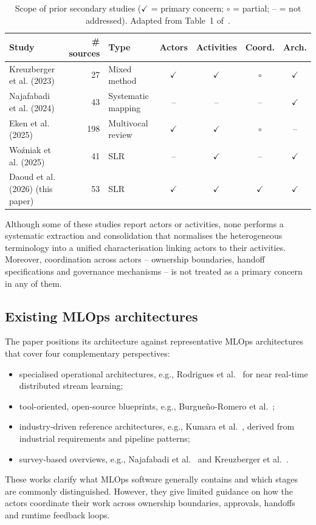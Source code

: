\documentclass[11pt,a4paper]{article}
\begin{document}
\begin{table}[h]
\centering
\caption{Scope of prior secondary studies ($\checkmark$ = primary concern; $\circ$ = partial; -- = not addressed). Adapted from Table~1 of~\cite{daoud2026}.}\label{tab:secondary}
\small
\begin{tabular}{@{}lrlcccc@{}}
\toprule
Study & \# sources & Type & Actors & Activities & Coord. & Arch. \\
\midrule
Kreuzberger et al. (2023)~\cite{kreuzberger2023} & 27 & Mixed method & $\checkmark$ & $\checkmark$ & $\circ$ & $\checkmark$ \\
Najafabadi et al. (2024)~\cite{najafabadi2024} & 43 & Systematic mapping & -- & -- & -- & $\checkmark$ \\
Eken et al. (2025)~\cite{eken2025} & 198 & Multivocal review & $\checkmark$ & $\checkmark$ & $\circ$ & -- \\
Wo\'zniak et al. (2025)~\cite{wozniak2025} & 41 & SLR & -- & $\checkmark$ & -- & $\checkmark$ \\
Daoud et al. (2026) (this paper) & 53 & SLR & $\checkmark$ & $\checkmark$ & $\checkmark$ & $\checkmark$ \\
\bottomrule
\end{tabular}
\end{table}

Although some of these studies report actors or activities, none performs a systematic extraction and consolidation that normalises the heterogeneous terminology into a unified characterisation linking actors to their activities. Moreover, coordination across actors -- ownership boundaries, handoff specifications and governance mechanisms -- is not treated as a primary concern in any of them.

\subsection{Existing MLOps architectures}

The paper positions its architecture against representative MLOps architectures that cover four complementary perspectives:
\begin{itemize}
  \item specialised operational architectures, e.g., Rodrigues et al.~\cite{rodrigues2025} for near real-time distributed stream learning;
  \item tool-oriented, open-source blueprints, e.g., Burgue\~no-Romero et al.~\cite{burgueno2025};
  \item industry-driven reference architectures, e.g., Kumara et al.~\cite{kumara2025}, derived from industrial requirements and pipeline patterns;
  \item survey-based overviews, e.g., Najafabadi et al.~\cite{najafabadi2024} and Kreuzberger et al.~\cite{kreuzberger2023}.
\end{itemize}
These works clarify what MLOps software generally contains and which stages are commonly distinguished. However, they give limited guidance on how the actors coordinate their work across ownership boundaries, approvals, handoffs and runtime feedback loops.
\end{document}
